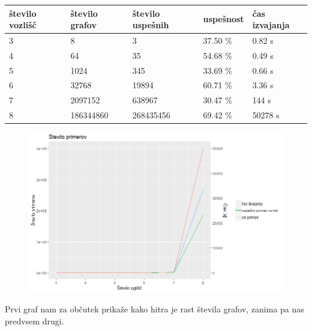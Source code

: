 \documentclass[12pt,a4paper]{amsart}
\theoremstyle{definition} %
\theoremstyle{plain} %
\begin{document}
\begin{adjustbox}{width={\textwidth},totalheight={\textheight},keepaspectratio}%
\begin{tabular}{|l|l|l|l|l|}
\hline
\textbf{število vozlišč} & \textbf{število grafov} & \textbf{število uspešnih} & \textbf{uspešnost} & \textbf{čas izvajanja} \\ \hline
3           & 8            & 3                & 37.50 \%     & 0.82 s         \\ \hline
4           & 64           & 35               & 54.68 \%     & 0.49 s         \\ \hline
5           & 1024         & 345              & 33.69 \%     & 0.66 s         \\ \hline
6           & 32768        & 19894            & 60.71 \%     & 3.36 s         \\ \hline
7           & 2097152      & 638967           & 30.47 \%     & 144 s          \\ \hline
8           & 186344860    & 268435456        & 69.42 \%     & 50278 s        \\ \hline
\end{tabular}
\end{adjustbox}

\begin{figure}[h]
\centering
\includegraphics[width=1\textwidth]{images/sm_graph_cases}
\end{figure}

Prvi graf nam za občutek prikaže kako hitra je rast števila grafov, zanima pa nas predvsem drugi.
\end{document}
